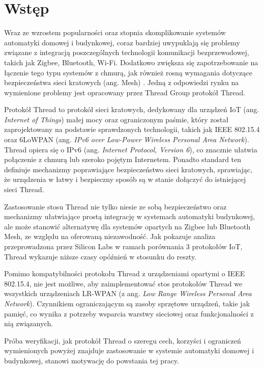 \section*{Wstęp}
\label{cha:wstep}

Wraz ze wzrostem popularności oraz stopnia skomplikowanie systemów automatyki domowej i budynkowej, coraz bardziej uwypuklają się problemy związane z integracją poszczególnych technologii komunikacji bezprzewodowej, takich jak Zigbee, Bluetooth, Wi-Fi. Dodatkowo zwiększa się zapotrzebowanie na łączenie tego typu systemów z chmurą, jak również rosną wymagania dotyczące bezpieczeństwa sieci kratowych (ang. Mesh) \cite{thread-smart-home}. Jedną z odpowiedzi rynku na wymienione problemy jest opracowany przez Thread Group protokół Thread.

Protokół Thread to protokół sieci kratowych, dedykowany dla urządzeń IoT (ang. \textit{Internet of Things}) małej mocy oraz ograniczonym paśmie, który został zaprojektowany na podstawie sprawdzonych technologii, takich jak IEEE 802.15.4 oraz 6LoWPAN (ang. \textit{IPv6 over Low-Power Wireless Personal Area Network}). Thread opiera się o IPv6 (ang. \textit{Internet Protocol, Version 6}), co znacznie ułatwia połączenie z chmurą lub szeroko pojętym Internetem. Ponadto standard ten definiuje mechanizmy poprawiające bezpieczeństwo sieci kratowych, sprawiając, że urządzenia w łatwy i bezpieczny sposób są w stanie dołączyć do istniejącej sieci Thread.

Zastosowanie stosu Thread nie tylko niesie ze sobą bezpieczeństwo oraz mechanizmy ułatwiające prostą integrację w systemach automatyki budynkowej, ale może stanowić alternatywę dla systemów opartych na Zigbee lub Bluetooth Mesh, ze względu na oferowaną niezawodność. Jak pokazuje analiza przeprowadzona przez Silicon Labs \cite{thread-bt-zigbee-comparison} w ramach porównania 3 protokołów IoT, Thread wykazuje niższe czasy opóźnień w stosunku do reszty.

Pomimo kompatybilności protokołu Thread z urządzeniami opartymi o IEEE 802.15.4, nie jest możliwe, aby zaimplementować stos protokołów Thread we wszystkich urządzeniach LR-WPAN (z ang. \textit{Low Range Wireless Personal Area Network}). Czynnikiem ograniczającym są zasoby sprzętowe urządzeń, takie jak pamięć, co wynika z potrzeby wsparcia warstwy sieciowej oraz funkcjonalności z nią związanych.

Próba weryfikacji, jak protokół Thread o szeregu cech, korzyści i ograniczeń wymienionych powyżej znajduje zastosowanie w systemie automatyki domowej i budynkowej, stanowi motywację do powstania tej pracy.


